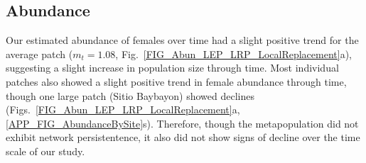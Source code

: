 \documentclass[12pt, oneside]{article}   	%
\begin{document}

\subsection*{Abundance}

Our estimated abundance of females over time had a slight positive trend for the average patch ($m_t = 1.08$, Fig.\ \ref{FIG_Abun_LEP_LRP_LocalReplacement}a), suggesting a slight increase in population size through time. Most individual patches also showed a slight positive trend in female abundance through time, though one large patch (Sitio Baybayon) showed declines (Figs.\ \ref{FIG_Abun_LEP_LRP_LocalReplacement}a, \ref{APP_FIG_AbundanceBySite}s). Therefore, though the metapopulation did not exhibit network persistentence, it also did not show signs of decline over the time scale of our study. 

\end{document}
